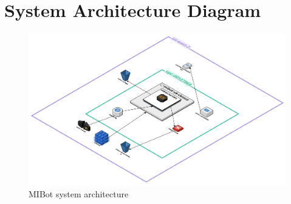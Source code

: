 \chapter{System Architecture Diagram}
\label{app:architecture-diagrams}

\begin{figure}[h!]
    \centering
\includegraphics[width=0.99\linewidth]{fig/3bc60efd-554e-416c-87c9-8e19116d1634.pdf}
    \caption{MIBot system architecture}
    \label{fig:mibot-sys-arch}
\end{figure}